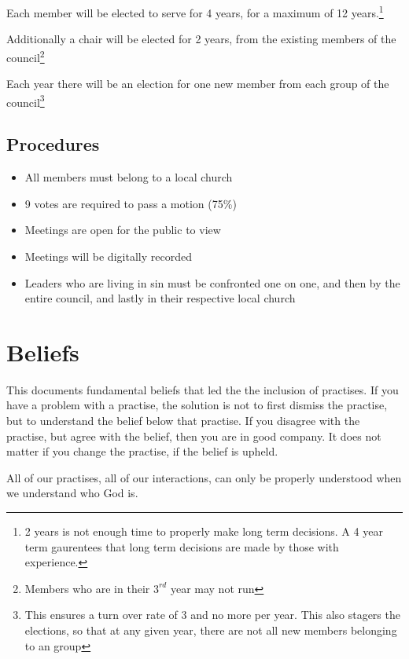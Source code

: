 \documentclass[CSHFoundation.tex]{subfiles}
\begin{document}
Each member will be elected to serve for 4 years, for a maximum of 12 years.\footnote{2 years is not enough time to properly make long term decisions. A 4 year term gaurentees that long term decisions are made by those with experience.}

\vspace*{4mm}
Additionally a chair will be elected for 2 years, from the existing members of the council\footnote{Members who are in their $3^{rd}$ year may not run}

\vspace*{4mm}
Each year there will be an election for one new member from each group of the council\footnote{This ensures a turn over rate of 3 and no more per year. This also stagers the elections, so that at any given year, there are not all new members belonging to an group}

\subsection{Procedures}

\begin{itemize}
\item All members must belong to a local church
\item 9 votes are required to pass a motion (75\%)
\item Meetings are open for the public to view
\item Meetings will be digitally recorded
\item Leaders who are living in sin must be confronted one on one, and then by the entire council, and lastly in their respective local church
\end{itemize} 



\section{Beliefs}

This documents fundamental beliefs that led the the inclusion of practises. If you have a problem with a practise, the solution is not to first dismiss the practise, but to understand the belief below that practise. If you disagree with the practise, but agree with the belief, then you are in good company. It does not matter if you change the practise, if the belief is upheld.

All of our practises, all of our interactions, can only be properly understood when we understand who God is.
\end{document}
